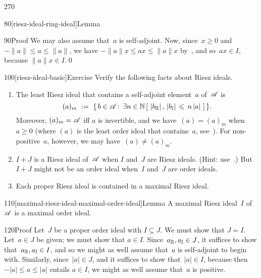 \begin{parsec}{270}
\begin{point}{80}[riesz-ideal-ring-ideal]{Lemma}
\begin{point}{90}{Proof}
We may also assume that~$a$ is self-adjoint.
Now, since~$x\geq 0$ and $-\|a\|\leq a\leq \|a\|$,
we have $-\|a\|x \leq ax\leq \|a\|x$
by~,
and so~$ax\in I$,
because $\|a\|x\in I$.\qed
\end{point}
\end{point}
\begin{point}{100}[riesz-ideal-basic]{Exercise}%
Verify the following facts about Riesz ideals.
\begin{enumerate}
\item
The least Riesz ideal that contains a self-adjoint element~$a$
of~$\mathscr{A}$ is
\begin{equation*}
(a)_m\ :=\ \{\,b\in \mathscr{A}\colon\, 
\exists n\in \mathbb{N}\,[\ \left|b_{\mathbb{R}}\right|,\,\left|b_{\mathbb{I}}\right|
\,\leqslant\, n\left|a\right| \ ]\,\}.
\end{equation*}
Moreover,  $(a)_m=\mathscr{A}$ iff $a$ is invertible,
and we have~$(a)=(a)_m$ when~$a\geq 0$
(where $(a)$ is the least order ideal that contains~$a$,
see~).
For non-positive~$a$, however, we may have~$(a)\neq (a)_m$.
\item
$I+J$ is a Riesz ideal of~$\mathscr{A}$
when $I$ and~$J$ are Riesz ideals. (Hint: use~.)
But~$I+J$ might not be an order ideal
when~$I$ and~$J$ are order ideals.

\item
Each proper Riesz ideal is contained in a maximal Riesz ideal.
\end{enumerate}
\end{point}
\begin{point}{110}[maximal-riesz-ideal-maximal-order-ideal]{Lemma}%
A maximal Riesz ideal~$I$ of~$\mathscr{A}$
is a maximal order ideal.
\begin{point}{120}{Proof}%
Let~$J$ be a proper order ideal with $I\subseteq J$.
We must show that $J=I$.
Let~$a\in J$ be given;
we must show that $a\in I$.
Since~$a_{\mathbb{R}},a_{\mathbb{I}}\in J$,
it suffices to show that~$a_{\mathbb{R}},a_{\mathbb{I}}\in I$,
and so we might as well assume that~$a$ is self-adjoint
to begin with.
Similarly,
since~$\left|a\right|\in J$,
and it suffices to show that~$\left|a\right|\in I$,
because then $-\left|a\right|\leq a\leq \left|a\right|$
entails $a\in I$,
we might as well assume that~$a$ is positive.


\end{point}
\end{point}
\end{parsec}
